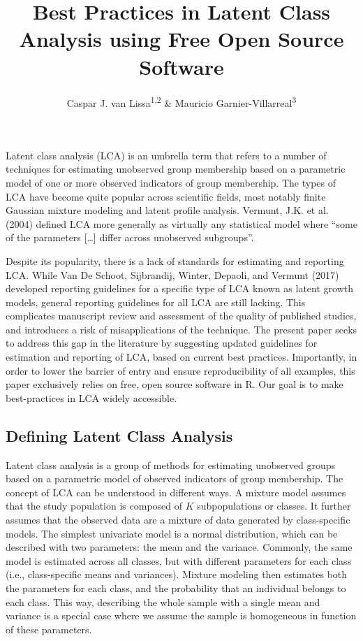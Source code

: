 \documentclass[
  ,man,floatsintext]{apa6}
\title{Best Practices in Latent Class Analysis using Free Open Source Software}
\author{Caspar J. van Lissa\textsuperscript{1,2} \& Mauricio Garnier-Villarreal\textsuperscript{3}}
\date{}
\affiliation{\vspace{0.5cm}\textsuperscript{1} Utrecht University, Methodology \& Statistics\\\textsuperscript{2} Open Science Community Utrecht\\\textsuperscript{3} Vrije Universiteit Amsterdam, Sociology}
\begin{document}
\maketitle

Latent class analysis (LCA) is an umbrella term that refers to a number
of techniques for estimating unobserved group membership based on a
parametric model of one or more observed indicators of group membership.
The types of LCA have become quite popular across scientific fields,
most notably finite Gaussian mixture modeling and latent profile
analysis. Vermunt, J.K. et al. (2004) defined LCA more generally as
virtually any statistical model where ``some of the parameters {[}\ldots{]}
differ across unobserved subgroups''.

Despite its popularity, there is a lack of standards for estimating and
reporting LCA. While Van De Schoot, Sijbrandij, Winter, Depaoli, and Vermunt (2017) developed
reporting guidelines for a specific type of LCA known as latent growth
models, general reporting guidelines for all LCA are still lacking. This
complicates manuscript review and assessment of the quality of published
studies, and introduces a risk of misapplications of the technique. The
present paper seeks to address this gap in the literature by suggesting
updated guidelines for estimation and reporting of LCA, based on current
best practices. Importantly, in order to lower the barrier of entry and
ensure reproducibility of all examples, this paper exclusively relies on
free, open source software in R. Our goal is to make best-practices in
LCA widely accessible.

\hypertarget{defining-latent-class-analysis}{%
\subsection{Defining Latent Class Analysis}\label{defining-latent-class-analysis}}

Latent class analysis is a group of methods for estimating unobserved
groups based on a parametric model of observed indicators of group
membership. The concept of LCA can be understood in different ways. A
mixture model assumes that the study population is composed of \(K\)
subpopulations or classes. It further assumes that the observed data are
a mixture of data generated by class-specific models. The simplest
univariate model is a normal distribution, which can be described with
two parameters: the mean and the variance. Commonly, the same model is
estimated across all classes, but with different parameters for each
class (i.e., class-specific means and variances). Mixture modeling then
estimates both the parameters for each class, and the probability that
an individual belongs to each class. This way, describing the whole
sample with a single mean and variance is a special case where we assume
the sample is homogeneous in function of these parameters.
\end{document}
